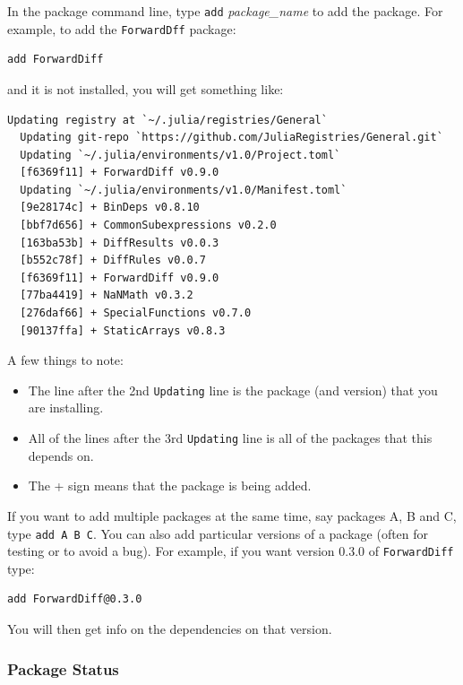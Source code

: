 In the package command line, type \texttt{add} \emph{package\_name} to
add the package. For example, to add the \texttt{ForwardDff} package:

\begin{verbatim}
add ForwardDiff
\end{verbatim}

and it is not installed, you will get something like:

\begin{verbatim}
Updating registry at `~/.julia/registries/General`
  Updating git-repo `https://github.com/JuliaRegistries/General.git`
  Updating `~/.julia/environments/v1.0/Project.toml`
  [f6369f11] + ForwardDiff v0.9.0
  Updating `~/.julia/environments/v1.0/Manifest.toml`
  [9e28174c] + BinDeps v0.8.10
  [bbf7d656] + CommonSubexpressions v0.2.0
  [163ba53b] + DiffResults v0.0.3
  [b552c78f] + DiffRules v0.0.7
  [f6369f11] + ForwardDiff v0.9.0
  [77ba4419] + NaNMath v0.3.2
  [276daf66] + SpecialFunctions v0.7.0
  [90137ffa] + StaticArrays v0.8.3
\end{verbatim}

A few things to note:

\begin{itemize}

\item
  The line after the 2nd \texttt{Updating} line is the package (and
  version) that you are installing.
\item
  All of the lines after the 3rd \texttt{Updating} line is all of the
  packages that this depends on.
\item
  The + sign means that the package is being added.
\end{itemize}

If you want to add multiple packages at the same time, say packages A, B
and C, type \texttt{add\ A\ B\ C}. You can also add particular versions
of a package (often for testing or to avoid a bug). For example, if you
want version 0.3.0 of \texttt{ForwardDiff} type:

\begin{verbatim}
add ForwardDiff@0.3.0
\end{verbatim}

You will then get info on the dependencies on that version.

\hypertarget{package-status}{%
\subsubsection{Package Status}\label{package-status}}

